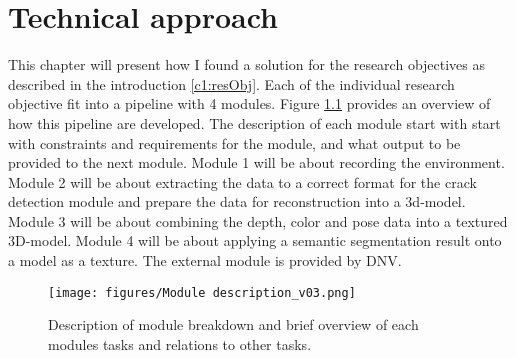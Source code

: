 \chapter{Technical approach} %
This chapter will present how I found a solution for the research objectives as described in the introduction \ref{c1:resObj}. Each of the individual research objective fit into a pipeline with 4 modules. 
Figure \ref{fig:moduleBreak} provides an overview of how this pipeline are developed. The description of each module start with start with constraints and requirements for the module, and what output to be provided to the next module. Module 1 will be about recording the environment. Module 2 will be about extracting the data to a correct format for the crack detection module and prepare the data for reconstruction into a 3d-model. Module 3 will be about combining the depth, color and pose data into a textured 3D-model. Module 4 will be about applying a semantic segmentation result onto a model as a texture. The external module is provided by DNV. 

\begin{figure}[h]
    \centering
    \texttt{[image: figures/Module description\_v03.png]}
    \caption{Description of module breakdown and brief overview of each modules tasks and relations to other tasks. }
    \label{fig:moduleBreak}
\end{figure}




